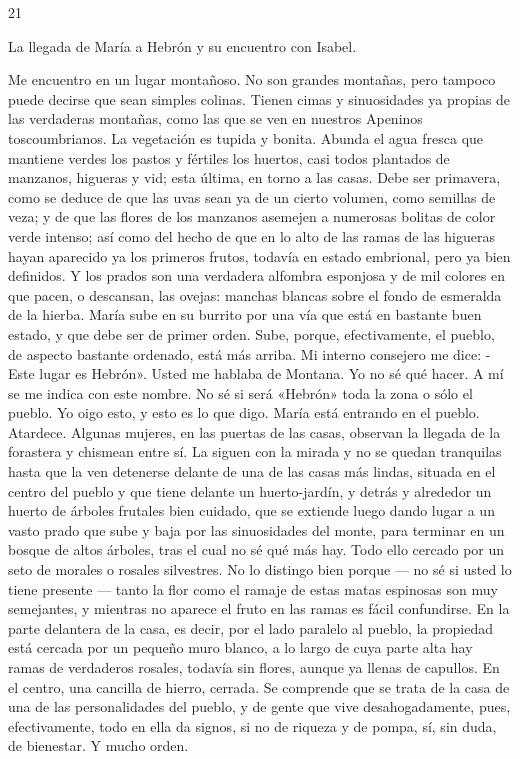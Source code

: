 \documentclass[12pt]{book} %
\begin{document}
21 
 
La llegada de María a Hebrón y su encuentro con Isabel. 
 
Me encuentro en un lugar montañoso. No son grandes montañas, pero tampoco puede decirse que sean simples colinas. Tienen cimas y sinuosidades ya propias de las verdaderas montañas, como las que se ven en nuestros Apeninos toscoumbrianos. La vegetación es tupida y bonita. Abunda el agua fresca que mantiene verdes los pastos y fértiles los huertos, casi todos plantados de manzanos, higueras y vid; esta última, en torno a las casas. Debe ser primavera, como se deduce de que las uvas sean ya de un cierto volumen, como semillas de veza; y de que las flores de los manzanos asemejen a numerosas bolitas de color verde intenso; así como del hecho de que en lo alto de las ramas de las higueras hayan aparecido ya los primeros frutos, todavía en estado embrional, pero ya bien definidos. Y los prados son una verdadera alfombra esponjosa y de mil colores en que pacen, o descansan, las ovejas: manchas blancas sobre el fondo de esmeralda de la hierba. 
María sube en su burrito por una vía que está en bastante buen estado, y que debe ser de primer orden. Sube, porque, 
efectivamente, el pueblo, de aspecto bastante ordenado, está más arriba. Mi interno consejero me dice: 
- Este lugar es Hebrón». Usted me hablaba de Montana. Yo no sé qué hacer. A mí se me indica con este nombre. No sé 
si será «Hebrón» toda la zona o sólo el pueblo. Yo oigo esto, y esto es lo que digo. 
María está entrando en el pueblo. Atardece. Algunas mujeres, en las puertas de las casas, observan la llegada de la 
forastera y chismean entre sí. La siguen con la mirada y no se quedan tranquilas hasta que la ven detenerse delante de una de las casas más lindas, situada en el centro del pueblo y que tiene delante un huerto-jardín, y detrás y alrededor un huerto de árboles frutales bien cuidado, que se extiende luego dando lugar a un vasto prado que sube y baja por las sinuosidades del monte, para terminar en un bosque de altos árboles, tras el cual no sé qué más hay. Todo ello cercado por un seto de morales o rosales silvestres. No lo distingo bien porque — no sé si usted lo tiene presente — tanto la flor como el ramaje de estas matas espinosas son muy semejantes, y mientras no aparece el fruto en las ramas es fácil confundirse. En la parte delantera de la casa, es decir, por el lado paralelo al pueblo, la propiedad está cercada por un pequeño muro blanco, a lo largo de cuya parte alta hay ramas de verdaderos rosales, todavía sin flores, aunque ya llenas de capullos. En el centro, una cancilla de hierro, cerrada. Se comprende que se trata de la casa de una de las personalidades del pueblo, y de gente que vive desahogadamente, pues, efectivamente, todo en ella da signos, si no de riqueza y de pompa, sí, sin duda, de bienestar. Y mucho orden. 
\end{document}
